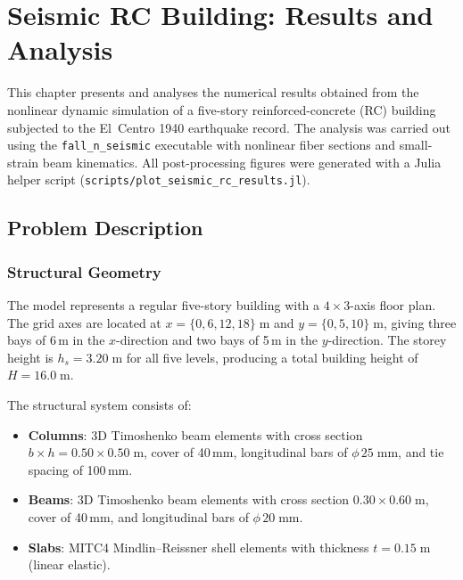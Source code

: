 
\chapter{Seismic RC Building: Results and Analysis}
\label{ch:seismic-rc-results}

This chapter presents and analyses the numerical results obtained from
the nonlinear dynamic simulation of a five-story reinforced-concrete
(RC) building subjected to the El~Centro 1940 earthquake record.  The
analysis was carried out using the \texttt{fall\_n\_seismic} executable
with nonlinear fiber sections and small-strain beam kinematics.  All
post-processing figures were generated with a Julia helper script
(\texttt{scripts/plot\_seismic\_rc\_results.jl}).


\section{Problem Description}
\label{sec:seismic-rc-problem}

\subsection{Structural Geometry}

The model represents a regular five-story building with a
$4 \times 3$-axis floor plan.  The grid axes are located at
$x = \{0, 6, 12, 18\}\;\mathrm{m}$ and
$y = \{0, 5, 10\}\;\mathrm{m}$, giving three bays of 6\,m in the
$x$-direction and two bays of 5\,m in the $y$-direction.  The storey
height is $h_s = 3.20\;\mathrm{m}$ for all five levels, producing
a total building height of $H = 16.0\;\mathrm{m}$.

The structural system consists of:
%
\begin{itemize}[nosep]
  \item \textbf{Columns}: 3D Timoshenko beam elements with cross section
        $b \times h = 0.50 \times 0.50\;\mathrm{m}$, cover of 40\,mm,
        longitudinal bars of $\phi\,25\;\mathrm{mm}$, and tie spacing of
        100\,mm.
  \item \textbf{Beams}: 3D Timoshenko beam elements with cross section
        $0.30 \times 0.60\;\mathrm{m}$, cover of 40\,mm, and
        longitudinal bars of $\phi\,20\;\mathrm{mm}$.
  \item \textbf{Slabs}: MITC4 Mindlin--Reissner shell elements with
        thickness $t = 0.15\;\mathrm{m}$ (linear elastic).
\end{itemize}


